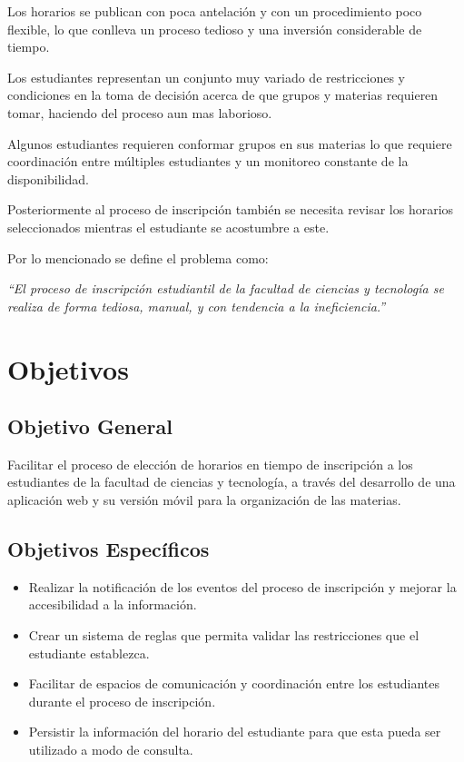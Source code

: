 \documentclass[letterpaper,11pt]{article}
\begin{document}
Los horarios se publican con poca antelación y con un procedimiento poco
flexible, lo que conlleva un proceso tedioso y una inversión considerable de
tiempo.

Los estudiantes representan un conjunto muy variado de restricciones y
condiciones en la toma de decisión acerca de que grupos y materias requieren
tomar, haciendo del proceso aun mas laborioso.

Algunos estudiantes requieren conformar grupos en sus materias lo que
requiere coordinación entre múltiples estudiantes y un monitoreo constante de la
disponibilidad.

Posteriormente al proceso de inscripción también se necesita revisar los
horarios seleccionados mientras el estudiante se acostumbre a este.

Por lo mencionado se define el problema como:

\emph{“El proceso de inscripción estudiantil de la facultad de ciencias y 
tecnología se realiza de forma tediosa, manual, y con tendencia a la
ineficiencia.”}

\section{Objetivos}

\subsection{Objetivo General}
Facilitar el proceso de elección de horarios en tiempo de inscripción a los
estudiantes de la facultad de ciencias y tecnología, a través del desarrollo de
una aplicación web y su versión móvil para la organización de las materias.

\subsection{Objetivos Específicos}
\begin{itemize}
\item Realizar la notificación de los eventos del proceso de inscripción y
    mejorar la accesibilidad a la información.
\item Crear un sistema de reglas que permita validar las restricciones que el
    estudiante establezca.
\item Facilitar de espacios de comunicación y coordinación entre los estudiantes
    durante el proceso de inscripción.
\item Persistir la información del horario del estudiante para que esta pueda ser
    utilizado a modo de consulta.
\end{itemize}
\end{document}

